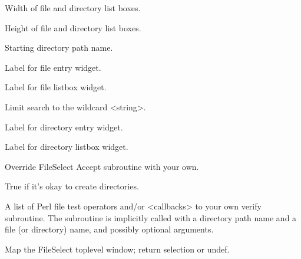 \vskip5pt

\begin{enum}{1cm}

Width of file  and directory list boxes.

Height of file  and directory list boxes.

Starting directory path name.

Label for file entry widget.

Label for file listbox widget.

Limit search to the wildcard <string>.

Label for directory entry widget.

Label for directory listbox widget.

Override FileSelect Accept subroutine with your own.

True if it's okay to create directories.

A list of Perl file test operators and/or <callbacks> to your own verify
subroutine.  The subroutine is implicitly called with a directory path
name and a file (or directory) name, and possibly optional arguments.

\end{enum}

\vskip5pt

\begin{enum}{1cm}

Map the FileSelect toplevel window; return selection or undef.

\end{enum}

